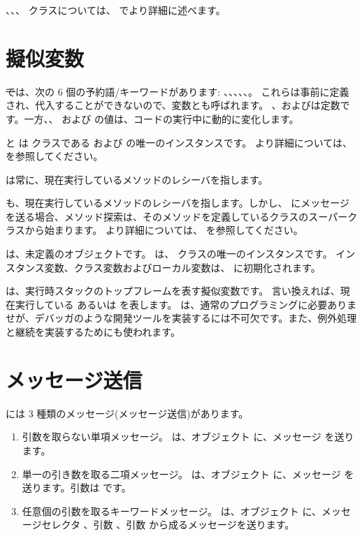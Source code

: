 \documentclass[a4paper,10pt,twoside]{book}
\begin{document}
、、、 クラスについては、 でより詳細に述べます。


\section{擬似変数}

\st では、次の 6 個の予約語/キーワードがあります:
、、、、、。
これらは事前に定義され、代入することができないので、変数とも呼ばれます。
、およびは定数です。一方、、 および  の値は、コードの実行中に動的に変化します。

 と  は  クラスである  および  の唯一のインスタンスです。
より詳細については、 を参照してください。

 は常に、現在実行しているメソッドのレシーバを指します。

 も、現在実行しているメソッドのレシーバを指します。しかし、 にメッセージを送る場合、メソッド探索は、そのメソッドを定義しているクラスのスーパークラスから始まります。
より詳細については、 を参照してください。

 は、未定義のオブジェクトです。
 は、 クラスの唯一のインスタンスです。
インスタンス変数、クラス変数およびローカル変数は、 に初期化されます。

 は、実行時スタックのトップフレームを表す擬似変数です。
言い換えれば、現在実行している  あるいは  を表します。
 は、通常のプログラミングに必要ありませが、デバッガのような開発ツールを実装するには不可欠です。また、例外処理と継続を実装するためにも使われます。

\section{メッセージ送信}

\pharo には 3 種類のメッセージ(メッセージ送信)があります。
\begin{enumerate}
  \item 引数を取らない単項メッセージ。
  は、オブジェクト  に、メッセージ  を送ります。
  \item 単一の引き数を取る二項メッセージ。
  	 は、オブジェクト  に、メッセージ \ct{+} を送ります。引数は  です。
  \item 任意個の引数を取るキーワードメッセージ。
  	 は、オブジェクト  に、メッセージセレクタ
	、引数 、引数  から成るメッセージを送ります。
\end{enumerate}
\end{document}
